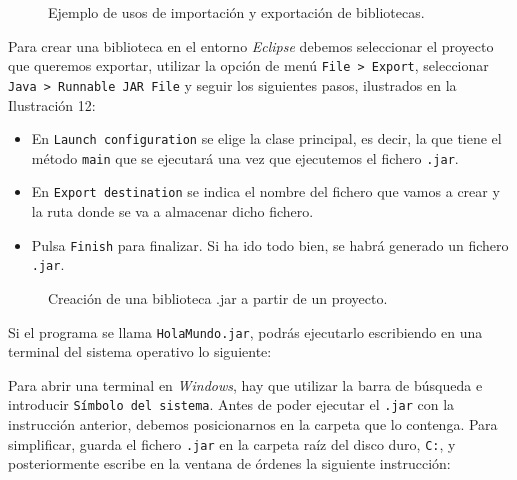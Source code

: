 \documentclass[
  spanish,
  11pt,
  a4paper,
  DIV=11,
  numbers=noendperiod]{scrartcl}
\providecommand{\tightlist}{%
  \setlength{\itemsep}{0pt}\setlength{\parskip}{0pt}}
\begin{document}
\begin{figure}
\caption{Ejemplo de usos de importación y exportación de bibliotecas.}\label{fig-import_export_scheme}
\end{figure}

Para crear una biblioteca en el entorno \emph{Eclipse} debemos seleccionar el proyecto que queremos exportar, utilizar la opción de menú \texttt{File\ \textgreater{}\ Export}, seleccionar \texttt{Java\ \textgreater{}\ Runnable\ JAR\ File} y seguir los siguientes pasos, ilustrados en la Ilustración 12:

\begin{itemize}
\tightlist
\item
 En \texttt{Launch\ configuration} se elige la clase principal, es decir, la que tiene el método \texttt{main} que se ejecutará una vez que ejecutemos el fichero \texttt{.jar}.
\item
 En \texttt{Export\ destination} se indica el nombre del fichero que vamos a crear y la ruta donde se va a almacenar dicho fichero.
\item
 Pulsa \texttt{Finish} para finalizar. Si ha ido todo bien, se habrá generado un fichero \texttt{.jar}.
\end{itemize}

\begin{figure}
\caption{Creación de una biblioteca .jar a partir de un proyecto.}\label{fig-create_jar}
\end{figure}

\begin{tcolorbox}[enhanced jigsaw, toprule=.15mm, coltitle=black, titlerule=0mm, opacitybacktitle=0.6, breakable, colback=white, colframe=quarto-callout-note-color-frame, colbacktitle=quarto-callout-note-color!10!white, opacityback=0, title={Ejecución de un programa a partir de un fichero .jar}, bottomtitle=1mm, rightrule=.15mm, toptitle=1mm, left=2mm, bottomrule=.15mm, leftrule=.75mm, arc=.35mm]

Si el programa se llama \texttt{HolaMundo.jar}, podrás ejecutarlo escribiendo en una terminal del sistema operativo lo siguiente:


Para abrir una terminal en \emph{Windows}, hay que utilizar la barra de búsqueda e introducir \texttt{Símbolo\ del\ sistema}. Antes de poder ejecutar el \texttt{.jar} con la instrucción anterior, debemos posicionarnos en la carpeta que lo contenga. Para simplificar, guarda el fichero \texttt{.jar} en la carpeta raíz del disco duro, \texttt{C:}, y posteriormente escribe en la ventana de órdenes la siguiente instrucción:


\end{tcolorbox}
\end{document}

